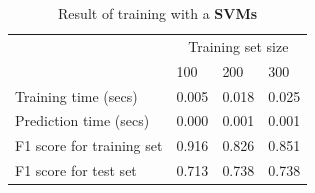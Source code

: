 \documentclass[12pt]{article}
\begin{document}
\setlength{\extrarowheight}{1.5pt}
\begin{table}[!htbp]
\caption{Result of training with a \textbf{SVMs}} %
\centering %
\begin{tabular}{|p{6cm}|p{1.5cm}|p{1.5cm}|p{1.5cm}|} %
\hline %
& \multicolumn{3}{c|}{Training set size}\\[5pt]
\cline{2-4} 
& 100 & 200 & 300\\[0.5ex]
\hline %

Training time (secs)   &       0.005 & 0.018 & 0.025 \\
Prediction time (secs)   &     0.000 & 0.001 & 0.001 \\
F1 score for training set  &   0.916 & 0.826 & 0.851 \\
F1 score for test set    &     0.713 & 0.738 & 0.738 \\
\hline %
\end{tabular}
\label{svmTable}
\end{table}
\end{document}
